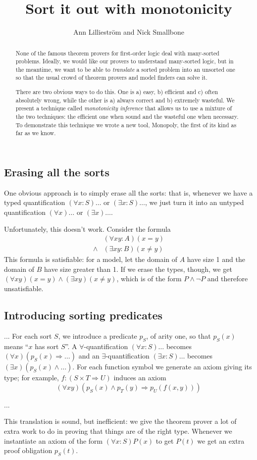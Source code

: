 \documentclass{report}
\title{Sort it out with monotonicity}
\author{Ann Lilliestr\"om and Nick Smallbone}
\begin{document}
\maketitle

\begin{abstract}
None of the famous theorem provers for first-order logic deal with
many-sorted problems. Ideally, we would like our provers to understand
many-sorted logic, but in the meantime, we want to be able to
\emph{translate} a sorted problem into an unsorted one so that the
usual crowd of theorem provers and model finders can solve it.

There are two obvious ways to do this. One is a) easy, b) efficient
and c) often absolutely wrong, while the other is a) always correct
and b) extremely wasteful. We present a technique called
\emph{monotonicity inference} that allows us to use a mixture of the
two techniques: the efficient one when sound and the wasteful one when
necessary. To demonstrate this technique we wrote a new tool,
Monopoly, the first of its kind as far as we know.
\end{abstract}

\subsection{Erasing all the sorts}

One obvious approach is to simply erase all the sorts: that is,
whenever we have a typed quantification $(\forall x:S)\ldots$ or
$(\exists x:S)\ldots$, we just turn it into an untyped quantification
$(\forall x)\ldots$ or $(\exists x)\ldots$.

Unfortunately, this doesn't work. Consider the formula
\begin{align*}
& (\forall x y:A)(x = y) \\
\land & (\exists x y:B)(x \neq y)
\end{align*}
This formula is satisfiable: for a model, let the domain of $A$ have
size 1 and the domain of $B$ have size greater than 1. If we erase the
types, though, we get $(\forall x y)(x = y) \land (\exists x y)(x \neq
y)$, which is of the form $P \land \neg P$ and therefore
unsatisfiable.

\subsection{Introducing sorting predicates}

... For each sort $S$, we introduce a predicate $p_S$, of arity one,
so that $p_S(x)$ means ``$x$ has sort $S$''. A
$\forall$-quantification $(\forall x:S)\ldots$ becomes $(\forall
x)(p_S(x) \Rightarrow \ldots)$ and an $\exists$-quantification
$(\exists x:S)\ldots$ becomes $(\exists x)(p_S(x) \land \ldots)$. For
each function symbol we generate an axiom giving its type; for
example, $f : (S \times T \Rightarrow U)$ induces an axiom
\begin{displaymath}
(\forall x y)(p_S(x) \land p_T(y) \Rightarrow p_U(f(x, y)))
\end{displaymath}

...

This translation is sound, but inefficient: we give the theorem prover
a lot of extra work to do in proving that things are of the right
type. Whenever we instantiate an axiom of the form $(\forall
x:S)P(x)$ to get $P(t)$ we get an extra proof obligation $p_S(t)$.
\end{document}
